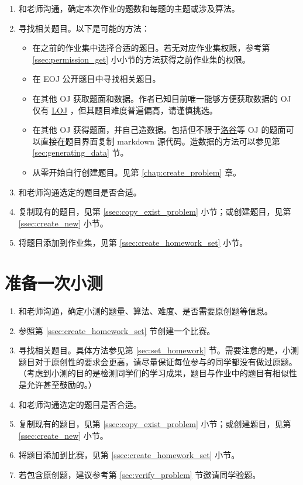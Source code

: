 \documentclass[oneside]{book}
\begin{document}
\label{sec:set_homework}

\begin{enumerate}
  \item 和老师沟通，确定本次作业的题数和每题的主题或涉及算法。
  \item 寻找相关题目。以下是可能的方法：
  \begin{itemize}
    \item 在之前的作业集中选择合适的题目。若无对应作业集权限，参考第 \ref{ssec:permission_get} 小小节的方法获得之前作业集的权限。
    \item 在 EOJ 公开题目中寻找相关题目。
    \item 在其他 OJ 获取题面和数据。作者已知目前唯一能够方便获取数据的 OJ 仅有 \href{https://loj.ac/}{LOJ} ，但其题目难度普遍偏高，请谨慎挑选。
    \item 在其他 OJ 获得题面，并自己造数据。包括但不限于\href{https://www.luogu.com.cn/}{洛谷}等 OJ 的题面可以直接在题目界面复制 markdown 源代码。造数据的方法可以参见第 \ref{sec:generating_data} 节。
    \item 从零开始自行创建题目。见第 \ref{chap:create_problem} 章。
  \end{itemize}
  \item 和老师沟通选定的题目是否合适。
  \item 复制现有的题目，见第 \ref{ssec:copy_exist_problem} 小节；或创建题目，见第 \ref{ssec:create_new} 小节。
  \item 将题目添加到作业集，见第 \ref{ssec:create_homework_set} 小节。
\end{enumerate}

\section{准备一次小测}

\begin{enumerate}
  \item 和老师沟通，确定小测的题量、算法、难度、是否需要原创题等信息。
  \item 参照第 \ref{ssec:create_homework_set} 节创建一个比赛。
  \item 寻找相关题目。具体方法参见第 \ref{sec:set_homework} 节。需要注意的是，小测题目对于原创性的要求会更高，请尽量保证每位参与的同学都没有做过原题。（考虑到小测的目的是检测同学们的学习成果，题目与作业中的题目有相似性是允许甚至鼓励的。）
  \item 和老师沟通选定的题目是否合适。
  \item 复制现有的题目，见第 \ref{ssec:copy_exist_problem} 小节；或创建题目，见第 \ref{ssec:create_new} 小节。
  \item 将题目添加到比赛，见第 \ref{ssec:create_homework_set} 小节。
  \item 若包含原创题，建议参考第 \ref{sec:verify_problem} 节邀请同学验题。
\end{enumerate}
\end{document}
